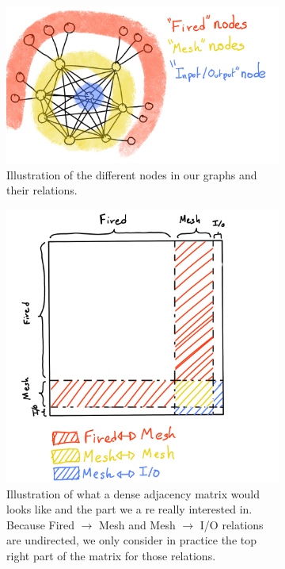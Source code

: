 \documentclass[../main.tex]{subfiles}
\begin{document}
\begin{figure}
  \centering
  \begin{subfigure}[t]{0.6\linewidth}
    \includegraphics[width=\linewidth]{images/jgnn/nodes_schema.png}
    \caption{Illustration of the different nodes in our graphs and their relations.}
    \label{fig:jgnn:node_schema}
  \end{subfigure}
  \hfill
  \begin{subfigure}[t]{0.39\linewidth}
    \includegraphics[width=\linewidth]{images/jgnn/adjacency_mat.png}
    \caption{Illustration of what a dense adjacency matrix would looks like and the part we a re really interested in. Because Fired $\rightarrow$ Mesh and Mesh $\rightarrow$ I/O relations are undirected, we only consider in practice the top right part of the matrix for those relations.}
    \label{fig:jgnn:adj}
  \end{subfigure}
  \caption{}
\end{figure}
\end{document}
